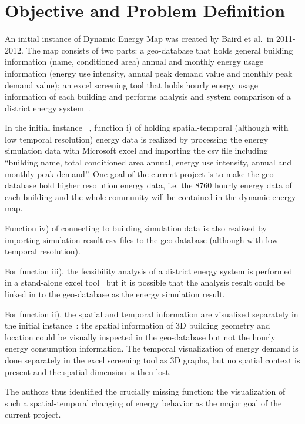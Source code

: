 \section{Objective and Problem Definition}
An initial instance of Dynamic Energy Map was created by Baird et al.\
in 2011-2012. The map consists of two parts: a geo-database that holds
general building information (name, conditioned area) annual and
monthly energy usage information (energy use intensity, annual peak
demand value and monthly peak demand value); an excel screening tool
that holds hourly energy usage information of each building and
performs analysis and system comparison of a district energy
system~\cite{baird2014}.

In the initial instance ~\cite{baird2014}, function i) of holding
spatial-temporal (although with low temporal resolution) energy data
is realized by processing the energy simulation data with Microsoft
excel and importing the csv file including ``building name, total
conditioned area annual, energy use intensity, annual and monthly peak
demand''. One goal of the current project is to make the geo-database
hold higher resolution energy data, i.e. the 8760 hourly energy data
of each building and the whole community will be contained in the
dynamic energy map.

Function iv) of connecting to building simulation data is also
realized by importing simulation result csv files to the geo-database
(although with low temporal resolution).

For function iii), the feasibility analysis of a district energy
system is performed in a stand-alone excel tool~\cite{baird2014} but
it is possible that the analysis result could be linked in to the
geo-database as the energy simulation result.

For function ii), the spatial and temporal information are visualized
separately in the initial instance~\cite{baird2014}: the spatial
information of 3D building geometry and location could be visually
inspected in the geo-database but not the hourly energy consumption
information. The temporal visualization of energy demand is done
separately in the excel screening tool as 3D graphs, but no spatial
context is present and the spatial dimension is then lost. 

The authors thus identified the crucially missing function: the
visualization of such a spatial-temporal changing of energy behavior
as the major goal of the current project.

